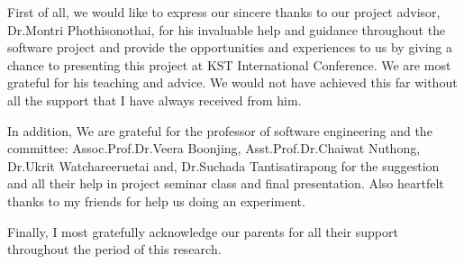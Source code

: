 \cleardoublepage


\begin{acknowledgements}

\hspace{1.5cm}First of all, we  would like to express our sincere thanks to our project advisor, Dr.Montri Phothisonothai, for his invaluable help and guidance throughout the software project and  provide the opportunities and experiences to us by giving a chance to presenting this project at KST International Conference. We are most grateful for his teaching and advice. We would not have achieved this far without all the support that I have always received from him.

\hspace{1.5cm}In addition, We are grateful for the professor of software engineering and the committee: 
Assoc.Prof.Dr.Veera Boonjing, 
Asst.Prof.Dr.Chaiwat Nuthong, 
Dr.Ukrit Watchareeruetai and,  
Dr.Suchada Tantisatirapong
for the suggestion and all their help in project seminar class and final presentation. 
Also heartfelt thanks to my friends for help us doing an experiment.

\hspace{1.5cm}Finally, I most gratefully acknowledge our parents for all their support throughout the period of this research.

\end{acknowledgements}